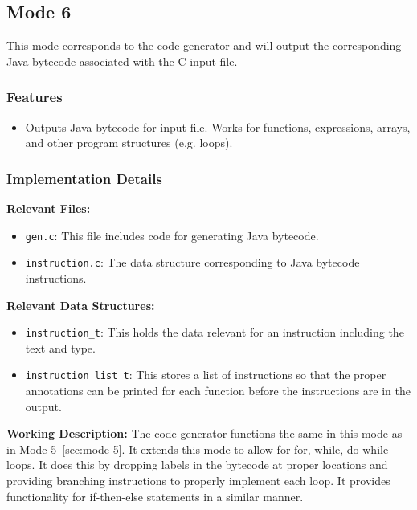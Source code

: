 \subsection{Mode 6}
\label{sec:mode-6}

This mode corresponds to the code generator and will output the corresponding
Java bytecode associated with the C input file.

\subsubsection{Features}

\begin{itemize}
    \item Outputs Java bytecode for input file. Works for functions,
    expressions, arrays, and other program structures (e.g. loops).
\end{itemize}

\subsubsection{Implementation Details}

\textbf{Relevant Files:}

\begin{itemize}
    \item \verb|gen.c|: This file includes code for generating Java bytecode.
    \item \verb|instruction.c|: The data structure corresponding to Java
    bytecode instructions.
\end{itemize}

\noindent \textbf{Relevant Data Structures:}

\begin{itemize}
    \item \verb|instruction_t|: This holds the data relevant for an instruction
    including the text and type.
    \item \verb|instruction_list_t|: This stores a list of instructions so that
    the proper annotations can be printed for each function before the
    instructions are in the output. 
\end{itemize}

\noindent \textbf{Working Description:} The code generator functions the same in
this mode as in Mode 5~\ref{sec:mode-5}. It extends this mode to allow for for,
while, do-while loops. It does this by dropping labels in the bytecode at
proper locations and providing branching instructions to properly implement each
loop. It provides functionality for if-then-else statements in a similar manner.